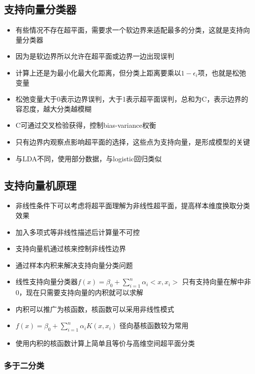 \documentclass[]{book}
\providecommand{\tightlist}{%
  \setlength{\itemsep}{0pt}\setlength{\parskip}{0pt}}
\begin{document}
\subsection{支持向量分类器}

\begin{itemize}
\tightlist
\item
  有些情况不存在超平面，需要求一个软边界来适配最多的分类，这就是支持向量分类器
\item
  因为是软边界所以允许在超平面或边界一边出现误判
\item
  计算上还是为最小化最大化距离，但分类上距离要乘以\(1 - \epsilon_i\)项，也就是松弛变量
\item
  松弛变量大于0表示边界误判，大于1表示超平面误判，总和为C，表示边界的容忍度，越大分类越模糊
\item
  C可通过交叉检验获得，控制bias-variance权衡
\item
  只有边界内观察点影响超平面的选择，这些点为支持向量，是形成模型的关键
\item
  与LDA不同，使用部分数据，与logistic回归类似
\end{itemize}

\subsection{支持向量机原理}

\begin{itemize}
\tightlist
\item
  非线性条件下可以考虑将超平面理解为非线性超平面，提高样本维度换取分类效果
\item
  加入多项式等非线性描述后计算量不可控
\item
  支持向量机通过核来控制非线性边界
\item
  通过样本内积来解决支持向量分类问题
\item
  线性支持向量分类器\(f(x) = \beta_0 + \sum_{i = 1}^{n} \alpha_i < x,x_i >\) 只有支持向量在解中非0，现在只需要支持向量的内积就可以求解
\item
  内积可以推广为核函数，核函数可以采用非线性模式
\item
  \(f(x) = \beta_0 + \sum_{i = 1}^{n} \alpha_i K( x,x_i )\) 径向基核函数较为常用
\item
  使用内积的核函数计算上简单且等价与高维空间超平面分类
\end{itemize}

\subsubsection{多于二分类}
\end{document}
